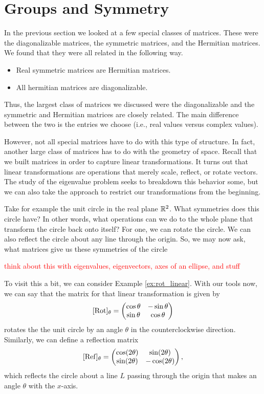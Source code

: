         \section{Groups and Symmetry}
            In the previous section we looked at a few special classes of matrices. These were the diagonalizable matrices, the symmetric matrices, and the Hermitian matrices.  We found that they were all related in the following way.
            \begin{itemize}
                \item Real symmetric matrices are Hermitian matrices.
                \item All hermitian matrices are diagonalizable.
            \end{itemize}
            Thus, the largest class of matrices we discussed were the diagonalizable and the symmetric and Hermitian matrices are closely related. The main difference between the two is the entries we choose (i.e., real values versus complex values).  
            
            However, not all special matrices have to do with this type of structure.  In fact, another large class of matrices has to do with the geometry of space.  Recall that we built matrices in order to capture linear transformations.  It turns out that linear transformations are operations that merely scale, reflect, or rotate vectors. The study of the eigenvalue problem seeks to breakdown this behavior some, but we can also take the approach to restrict our transformations from the beginning.
            
            Take for example the unit circle in the real plane $\mathbb{R}^2$. What symmetries does this circle have? In other words, what operations can we do to the whole plane that transform the circle back onto itself? For one, we can rotate the circle. We can also reflect the circle about any line through the origin. So, we may now ask, what matrices give us these symmetries of the circle
            
            \textcolor{red}{think about this with eigenvalues, eigenvectors, axes of an ellipse, and stuff}
            
            To visit this a bit, we can consider Example \ref{ex:rot_linear}. With our tools now, we can say that the matrix for that linear transformation is given by
            \[
            [\mathrm{Rot}]_\theta = \begin{pmatrix} \cos \theta & -\sin \theta \\ \sin \theta & \cos \theta \end{pmatrix}
            \]
            rotates the the unit circle by an angle $\theta$ in the counterclockwise direction.  Similarly, we can define a reflection matrix
            \[
            [\mathrm{Ref}]_\theta = \begin{pmatrix} \cos (2\theta) & \sin(2\theta) \\ \sin (2\theta) & -\cos(2\theta)\end{pmatrix},
            \]
            which reflects the circle about a line $L$ passing through the origin that makes an angle $\theta$ with the $x$-axis.
            
